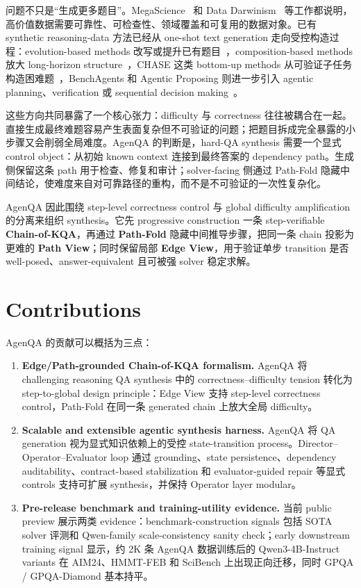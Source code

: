 \documentclass[11pt]{ctexart}
\begin{document}
问题不只是“生成更多题目”。MegaScience~\cite{fan2025megascience} 和 Data Darwinism~\cite{qin2026datadarwinism} 等工作都说明，高价值数据需要可靠性、可检查性、领域覆盖和可复用的数据对象。已有 synthetic reasoning-data 方法已经从 one-shot text generation 走向受控构造过程：evolution-based methods 改写或提升已有题目~\cite{wang2023selfinstruct,luo2025wizardmath,yu2024metamath,zeng2024autoevolinstruct}，composition-based methods 放大 long-horizon structure~\cite{lu2025rhorizon,xu2026compositionrl}，CHASE 这类 bottom-up methods 从可验证子任务构造困难题~\cite{patel2025chase}，BenchAgents 和 Agentic Proposing 则进一步引入 agentic planning、verification 或 sequential decision making~\cite{butt2025benchagents,jiao2026agenticproposing}。

这些方向共同暴露了一个核心张力：difficulty 与 correctness 往往被耦合在一起。直接生成最终难题容易产生表面复杂但不可验证的问题；把题目拆成完全暴露的小步骤又会削弱全局难度。AgenQA 的判断是，hard-QA synthesis 需要一个显式 control object：从初始 known context 连接到最终答案的 dependency path。生成侧保留这条 path 用于检查、修复和审计；solver-facing 侧通过 Path-Fold 隐藏中间结论，使难度来自对可靠路径的重构，而不是不可验证的一次性复杂化。

AgenQA 因此围绕 step-level correctness control 与 global difficulty amplification 的分离来组织 synthesis。它先 progressive construction 一条 step-verifiable \textbf{Chain-of-KQA}，再通过 \textbf{Path-Fold} 隐藏中间推导步骤，把同一条 chain 投影为更难的 \textbf{Path View}；同时保留局部 \textbf{Edge View}，用于验证单步 transition 是否 well-posed、answer-equivalent 且可被强 solver 稳定求解。

\section{Contributions}

AgenQA 的贡献可以概括为三点：

\begin{enumerate}
  \item \textbf{Edge/Path-grounded Chain-of-KQA formalism.} AgenQA 将 challenging reasoning QA synthesis 中的 correctness--difficulty tension 转化为 step-to-global design principle：Edge View 支持 step-level correctness control，Path-Fold 在同一条 generated chain 上放大全局 difficulty。
  \item \textbf{Scalable and extensible agentic synthesis harness.} AgenQA 将 QA generation 视为显式知识依赖上的受控 state-transition process。Director--Operator--Evaluator loop 通过 grounding、state persistence、dependency auditability、contract-based stabilization 和 evaluator-guided repair 等显式 controls 支持可扩展 synthesis，并保持 Operator layer modular。
  \item \textbf{Pre-release benchmark and training-utility evidence.} 当前 public preview 展示两类 evidence：benchmark-construction signals 包括 SOTA solver 评测和 Qwen-family scale-consistency sanity check；early downstream training signal 显示，约 2K 条 AgenQA 数据训练后的 Qwen3-4B-Instruct variants 在 AIM24、HMMT-FEB 和 SciBench 上出现正向迁移，同时 GPQA / GPQA-Diamond 基本持平。
\end{enumerate}
\end{document}
